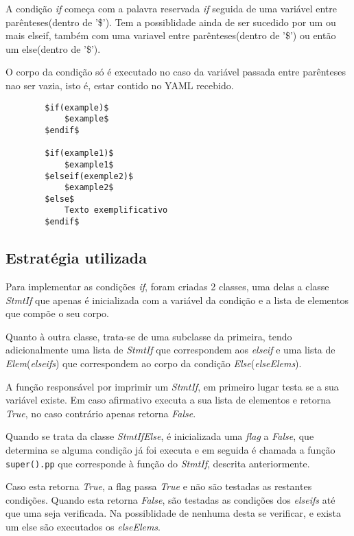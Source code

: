 \documentclass[../relatorio.tex]{subfiles}
\begin{document}
    A condição \textit{if} começa com a palavra reservada \textit{if}
    seguida de uma variável entre parênteses(dentro de '\$'). Tem a
    possiblidade ainda de ser sucedido por um ou mais elseif, também com 
    uma variavel entre parênteses(dentro de '\$') ou então um else(dentro de '\$').
    
    O corpo da condição só é executado no caso da variável passada entre parênteses
    nao ser vazia, isto é, estar contido no YAML recebido.

    \begin{verbatim}
        $if(example)$
            $example$
        $endif$

        $if(example1)$
            $example1$
        $elseif(exemple2)$
            $example2$
        $else$
            Texto exemplificativo   
        $endif$
    \end{verbatim}

    \subsection{Estratégia utilizada}

    Para implementar as condições \textit{if}, foram criadas 2 classes,
    uma delas a classe \textit{StmtIf} que apenas é inicializada com 
    a variável da condição e a lista de elementos que compõe o seu corpo.

    Quanto à outra classe, trata-se de uma subclasse da primeira, tendo 
    adicionalmente uma lista de \textit{StmtIf} que correspondem aos
    \textit{elseif} e uma lista de \textit{Elem}(\textit{elseifs}) que correspondem ao corpo
    da condição \textit{Else}(\textit{elseElems}). 

    A função responsável por imprimir um \textit{StmtIf}, em primeiro lugar testa se a sua 
    variável existe. Em caso afirmativo executa a sua lista de elementos e retorna \textit{True},
    no caso contrário apenas retorna \textit{False}. 
    
    Quando se trata da classe \textit{StmtIfElse}, é inicializada uma \textit{flag} a \textit{False},
    que determina se alguma condição já foi executa e em seguida é chamada a função 
    \texttt{super().pp} que corresponde à função do \textit{StmtIf}, descrita anteriormente.

    Caso esta retorna \textit{True}, a flag passa \textit{True} e não são testadas as restantes condições. 
    Quando esta retorna \textit{False}, são testadas as condições dos \textit{elseifs} até que uma seja verificada. 
    Na possiblidade de nenhuma desta se verificar, e exista um else são executados os \textit{elseElems}.

    
\end{document}
